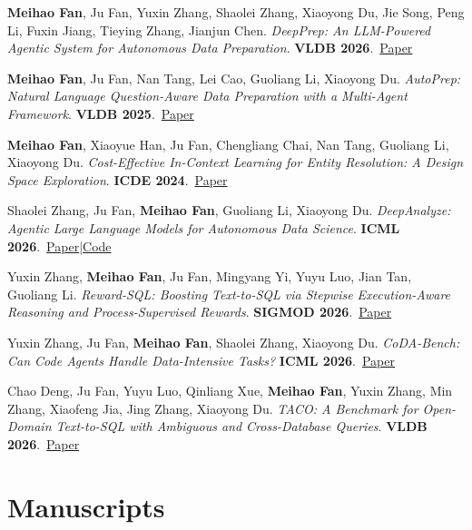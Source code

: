 \documentclass[a4paper,10pt]{article}
\newcommand{\pub}[4]{\item #1. \textit{#2}. \textbf{#3}.\ #4}
\newcommand{\pubq}[4]{\item #1. \textit{#2} \textbf{#3}.\ #4}
\begin{document}
\begin{enumerate}[leftmargin=15pt,label={[\arabic*]},itemsep=3pt,topsep=1pt,parsep=0pt]

\pub{\textbf{Meihao Fan}, Ju Fan, Yuxin Zhang, Shaolei Zhang, Xiaoyong Du, Jie Song, Peng Li, Fuxin Jiang, Tieying Zhang, Jianjun Chen}
{DeepPrep: An LLM-Powered Agentic System for Autonomous Data Preparation}
{VLDB 2026}
{\href{https://www.vldb.org/pvldb/vol19/p3371-fan.pdf}{Paper}}

\pub{\textbf{Meihao Fan}, Ju Fan, Nan Tang, Lei Cao, Guoliang Li, Xiaoyong Du}
{AutoPrep: Natural Language Question-Aware Data Preparation with a Multi-Agent Framework}
{VLDB 2025}
{\href{https://www.vldb.org/pvldb/vol18/p3504-fan.pdf}{Paper}}

\pub{\textbf{Meihao Fan}, Xiaoyue Han, Ju Fan, Chengliang Chai, Nan Tang, Guoliang Li, Xiaoyong Du}
{Cost-Effective In-Context Learning for Entity Resolution: A Design Space Exploration}
{ICDE 2024}
{\href{https://fmh1art.github.io/files/BatchER-ICDE2024.pdf}{Paper}}

\pub{Shaolei Zhang, Ju Fan, \textbf{Meihao Fan}, Guoliang Li, Xiaoyong Du}
{DeepAnalyze: Agentic Large Language Models for Autonomous Data Science}
{ICML 2026}
{\href{https://arxiv.org/abs/2510.16872}{Paper}\;|\;\href{https://github.com/ruc-datalab/DeepAnalyze}{Code}}

\pub{Yuxin Zhang, \textbf{Meihao Fan}, Ju Fan, Mingyang Yi, Yuyu Luo, Jian Tan, Guoliang Li}
{Reward-SQL: Boosting Text-to-SQL via Stepwise Execution-Aware Reasoning and Process-Supervised Rewards}
{SIGMOD 2026}
{\href{https://arxiv.org/abs/2505.04671}{Paper}}

\pubq{Yuxin Zhang, Ju Fan, \textbf{Meihao Fan}, Shaolei Zhang, Xiaoyong Du}
{CoDA-Bench: Can Code Agents Handle Data-Intensive Tasks?}
{ICML 2026}
{\href{https://arxiv.org/abs/2606.15300}{Paper}}

\pub{Chao Deng, Ju Fan, Yuyu Luo, Qinliang Xue, \textbf{Meihao Fan}, Yuxin Zhang, Min Zhang, Xiaofeng Jia, Jing Zhang, Xiaoyong Du}
{TACO: A Benchmark for Open-Domain Text-to-SQL with Ambiguous and Cross-Database Queries}
{VLDB 2026}
{\href{https://arxiv.org/abs/2606.14201}{Paper}}

\end{enumerate}

\section{Manuscripts}
\end{document}
